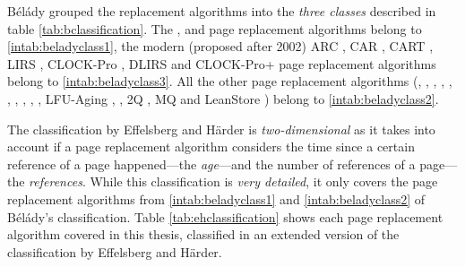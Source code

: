     Bélády grouped the replacement algorithms into the \emph{three classes} described in table \ref{tab:bclassification}. The ,  and  page replacement algorithms belong to \ref{intab:beladyclass1}, the modern (proposed after 2002) ARC \cite{Megiddo:2003}, CAR \cite{Bansal:2004}, CART \cite{Bansal:2004}, LIRS \cite{Jiang:2002}, CLOCK-Pro \cite{Jiang:2005}, DLIRS \cite{Li:2018} and CLOCK-Pro+ \cite{Li:2019} page replacement algorithms belong to \ref{intab:beladyclass3}. All the other page replacement algorithms (, ,  \cite{ONeil:1993},  \cite{Karedla:1994},  \cite{Corbato:1969}, ,  \cite{Effelsberg:1984},  \cite{Effelsberg:1984},  \cite{Effelsberg:1984}, , LFU-Aging \cite{Arlitt:2000-1},  \cite{Arlitt:2000-2}, 2Q \cite{Johnson:1994}, MQ \cite{Zhou:2001} and LeanStore \cite{Leis:2018}) belong to \ref{intab:beladyclass2}.

    The classification by Effelsberg and Härder is \emph{two-dimensional} as it takes into account if a page replacement algorithm considers the time since a certain reference of a page happened---the \emph{age}---and the number of references of a page---the \emph{references}. While this classification is \emph{very detailed}, it only covers the page replacement algorithms from \ref{intab:beladyclass1} and \ref{intab:beladyclass2} of Bélády's classification. Table \ref{tab:ehclassification} shows each page replacement algorithm covered in this thesis, classified in an extended version of the classification by Effelsberg and Härder.

